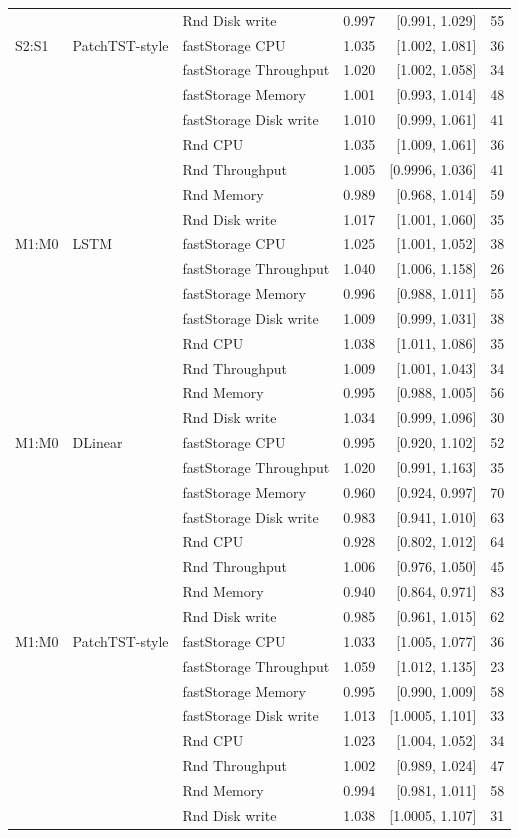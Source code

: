 \begin{longtable}{@{}lllrrr@{}}
 &  & Rnd Disk write & 0.997 & [0.991, 1.029] & 55 \\
\addlinespace
S2:S1 & PatchTST-style & fastStorage CPU & 1.035 & [1.002, 1.081] & 36 \\
 &  & fastStorage Throughput & 1.020 & [1.002, 1.058] & 34 \\
 &  & fastStorage Memory & 1.001 & [0.993, 1.014] & 48 \\
 &  & fastStorage Disk write & 1.010 & [0.999, 1.061] & 41 \\
 &  & Rnd CPU & 1.035 & [1.009, 1.061] & 36 \\
 &  & Rnd Throughput & 1.005 & [0.9996, 1.036] & 41 \\
 &  & Rnd Memory & 0.989 & [0.968, 1.014] & 59 \\
 &  & Rnd Disk write & 1.017 & [1.001, 1.060] & 35 \\
\addlinespace
M1:M0 & LSTM & fastStorage CPU & 1.025 & [1.001, 1.052] & 38 \\
 &  & fastStorage Throughput & 1.040 & [1.006, 1.158] & 26 \\
 &  & fastStorage Memory & 0.996 & [0.988, 1.011] & 55 \\
 &  & fastStorage Disk write & 1.009 & [0.999, 1.031] & 38 \\
 &  & Rnd CPU & 1.038 & [1.011, 1.086] & 35 \\
 &  & Rnd Throughput & 1.009 & [1.001, 1.043] & 34 \\
 &  & Rnd Memory & 0.995 & [0.988, 1.005] & 56 \\
 &  & Rnd Disk write & 1.034 & [0.999, 1.096] & 30 \\
\addlinespace
M1:M0 & DLinear & fastStorage CPU & 0.995 & [0.920, 1.102] & 52 \\
 &  & fastStorage Throughput & 1.020 & [0.991, 1.163] & 35 \\
 &  & fastStorage Memory & 0.960 & [0.924, 0.997] & 70 \\
 &  & fastStorage Disk write & 0.983 & [0.941, 1.010] & 63 \\
 &  & Rnd CPU & 0.928 & [0.802, 1.012] & 64 \\
 &  & Rnd Throughput & 1.006 & [0.976, 1.050] & 45 \\
 &  & Rnd Memory & 0.940 & [0.864, 0.971] & 83 \\
 &  & Rnd Disk write & 0.985 & [0.961, 1.015] & 62 \\
\addlinespace
M1:M0 & PatchTST-style & fastStorage CPU & 1.033 & [1.005, 1.077] & 36 \\
 &  & fastStorage Throughput & 1.059 & [1.012, 1.135] & 23 \\
 &  & fastStorage Memory & 0.995 & [0.990, 1.009] & 58 \\
 &  & fastStorage Disk write & 1.013 & [1.0005, 1.101] & 33 \\
 &  & Rnd CPU & 1.023 & [1.004, 1.052] & 34 \\
 &  & Rnd Throughput & 1.002 & [0.989, 1.024] & 47 \\
 &  & Rnd Memory & 0.994 & [0.981, 1.011] & 58 \\
 &  & Rnd Disk write & 1.038 & [1.0005, 1.107] & 31 \\
\bottomrule
\end{longtable}
